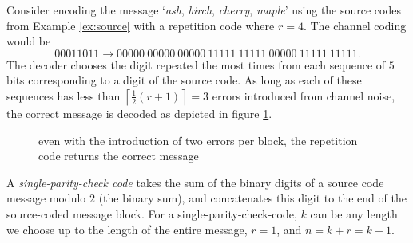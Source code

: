 \begin{example} \label{ex:repeat}
    Consider encoding the message `\textit{ash}, \textit{birch}, \textit{cherry}, \textit{maple}' using the source codes from Example \ref{ex:source} with a repetition code where $r = 4$. The channel coding would be
    \[
        00011011 \to 00000\ 00000\ 00000\ 11111\ 11111\ 00000\ 11111\ 11111.
    \]
    The decoder chooses the digit repeated the most times from each sequence of $5$ bits corresponding to a digit of the source code. As long as each of these sequences has less than $\left\lceil\frac{1}{2}(r + 1)\right\rceil = 3$ errors introduced from channel noise, the correct message is decoded as depicted in figure \ref{fig:repititionpathexample}.
    
\end{example}

\begin{figure}
    \centering
    \caption{even with the introduction of two errors per block, the repetition code returns the correct message}
    \label{fig:repititionpathexample}
\end{figure}

A \textit{single-parity-check code} takes the sum of the binary digits of a source code message modulo $2$ (the binary sum), and concatenates this digit to the end of the source-coded message block. For a single-parity-check-code, $k$ can be any length we choose up to the length of the entire message, $r = 1$, and $n = k + r = k + 1$.

